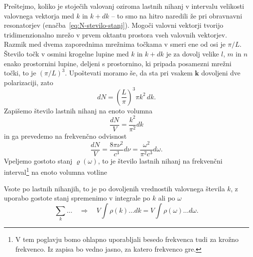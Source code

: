 Preštejmo, koliko je stoječih valovanj oziroma lastnih nihanj 
v intervalu velikosti valovnega
vektorja med $k$ in $k+dk$ -- to smo na hitro naredili že pri obravnavni
resonatorjev (enačba~\ref{eq:N-stevilo-stanj}). Mogoči valovni vektorji tvorijo tridimenzionalno
mrežo v prvem oktantu prostora vseh valovnih vektorjev. Razmik med
dvema zaporednima mrežnima točkama v smeri ene od osi je $\pi/L$.
Število točk v osmini krogelne lupine med $k$ in $k+dk$ je za dovolj
velike $l$, $m$ in $n$ enako prostornini lupine, deljeni
s prostornino, ki pripada posamezni mrežni točki, to je $(\pi/L)^{3}$.
Upoštevati moramo še, da sta pri vsakem $\mathbf{k}$ dovoljeni dve polarizaciji, zato
\begin{equation}
dN=\left(\frac{L}{\pi}\right)^{3}\pi k^{2}\, dk.
\label{4.2}
\end{equation}
Zapišemo število lastnih nihanj na enoto volumna
\begin{equation}
\frac{dN}{V}=\frac{ k^{2}}{\pi^{2}} dk
\label{4.3}
\end{equation}
in ga prevedemo na frekvenčno odvisnost
\begin{equation}
\frac{dN}{V}=\frac{8 \pi \nu^{2} }{c^{3}}d\nu = \frac{\omega^2}{\pi^2c^3}d\omega.
\end{equation}
Vpeljemo gostoto stanj  $\varrho (\omega)$, to je število lastnih nihanj na 
frekvenčni interval\footnote{V tem poglavju bomo ohlapno uporabljali besedo
frekvenca tudi za krožno frekvenco. Iz zapisa bo vedno jasno, za katero frekvenco gre.}
na enoto volumna votline

Vsote po lastnih nihanjih, to je po dovoljenih vrednostih valovnega števila $k$,
z uporabo gostote stanj spremenimo v integrale po $k$ ali po $\omega$
\begin{equation}
\sum_{k}\ldots \quad \Rightarrow \quad V\int\rho(k)\ldots dk=V\int\rho(\omega)\ldots d\omega.
\label{4.5}
\end{equation}


